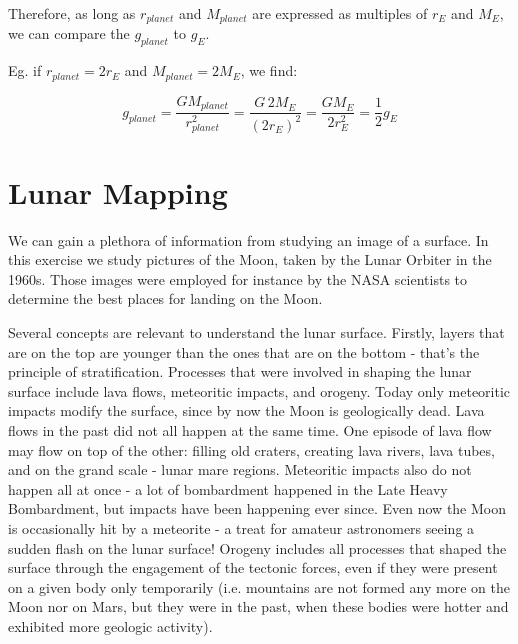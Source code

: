 \documentclass[paper=a4, fontsize=11pt]{scrartcl} %
\numberwithin{equation}{section} %
\begin{document}
Therefore, as long as $r_{planet}$ and $M_{planet}$ are expressed as multiples of $r_{E}$ and $M_{E}$, we can compare the $g_{planet}$ to $g_{E}$.
\newline

Eg. if $r_{planet} = 2 r_{E}$ and  $M_{planet} = 2 M_{E}$, we find:



\begin{equation}
g_{planet} = \frac{GM_{planet}}{r_{planet}^{2}} = \frac{G \, 2 M_{E}}{(2 r_{E})^{2}} = \frac{G M_{E}}{2 r_{E}^{2}}= \frac{1}{2} g_{E}
\end{equation}

\newpage





\section{Lunar Mapping }

We can gain a plethora of information from studying an image of a surface. In this exercise we study pictures of the Moon, taken by the Lunar Orbiter in the 1960s. Those images were employed for instance by the NASA scientists to determine the best places for landing on the Moon. 

Several concepts are relevant to understand the  lunar surface.  Firstly,  layers that are on the top are younger than the ones that are on the bottom - that's the principle of stratification.  Processes that were involved in shaping the lunar surface include lava flows,  meteoritic impacts, and orogeny. Today only meteoritic impacts modify the surface, since by now the Moon is geologically dead.  Lava flows in the past did  not all happen at the same time. One episode of lava flow  may flow on top of the other: filling old craters, creating lava rivers,  lava tubes, and on the grand scale  - lunar mare regions.  Meteoritic impacts also do not happen all at once - a lot of bombardment happened in the Late Heavy Bombardment, but impacts have been happening ever since. Even now the Moon is occasionally hit by a meteorite - a treat for amateur  astronomers seeing a sudden flash on the lunar surface!   Orogeny includes all processes that shaped the surface through the engagement of the tectonic  forces, even if they were present on a given body only temporarily (i.e. mountains are not formed any more on the Moon nor on Mars, but they were in the past, when these bodies were hotter and exhibited more geologic activity). 
\end{document}
